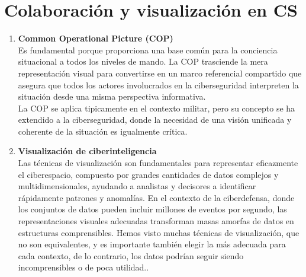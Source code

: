 \section{Colaboración y visualización en CS}
\begin{enumerate}[resume]
\item \textbf{Common Operational Picture (COP)} \\
Es fundamental porque proporciona una base común para la conciencia situacional a todos los niveles de mando. 
La COP trasciende la mera representación visual para convertirse en un marco referencial compartido que asegura que todos los actores involucrados en la ciberseguridad interpreten la situación desde una misma perspectiva informativa.\\
La COP se aplica tipicamente en el contexto militar, pero su concepto se ha extendido a la ciberseguridad, donde la necesidad de una visión unificada y coherente de la situación es igualmente crítica.



\item \textbf{Visualización de ciberinteligencia} \\
Las técnicas de visualización son fundamentales para representar eficazmente el ciberespacio, compuesto por grandes cantidades de datos complejos y multidimensionales, ayudando a analistas y decisores a identificar rápidamente patrones y anomalías. En el contexto de la ciberdefensa, donde los conjuntos de datos pueden incluir millones de eventos por segundo, las representaciones visuales adecuadas transforman masas amorfas de datos en estructuras comprensibles.
Hemos visto muchas técnicas de visualización, que no son equivalentes, y es importante también elegir la más adecuada para cada contexto, de lo contrario, los datos podrían seguir siendo incomprensibles o de poca utilidad..


\end{enumerate}

